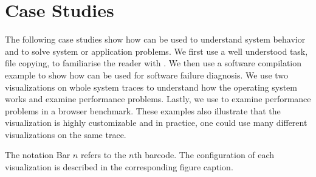 \section{Case Studies}
\label{sec:study}

The following case studies show how \lviz{} can be used to
understand system behavior and to solve system or application problems.
We first use a well understood task, file copying,
to familiarise the reader with \VDP{}.
We then use a software compilation example to show how \VDP{} can
be used for software failure diagnosis.
We use two visualizations on whole system traces to understand
how the operating system works and examine performance problems.
Lastly, we use \VDP{} to examine performance problems in a browser benchmark.
These examples also illustrate that the \VDP{} visualization is highly
customizable and in practice, one could use many different visualizations
on the same trace.


The notation Bar $n$ refers to the $n$th barcode.
The configuration of each visualization is described in the corresponding
figure caption.





%

%
%
